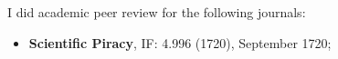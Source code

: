 \footnotesize I did academic peer review for the following journals: 
    \begin{itemize}
        \footnotesize
         \item{\textbf{Scientific Piracy}, IF: 4.996 (1720), September 1720;}
     \end{itemize}